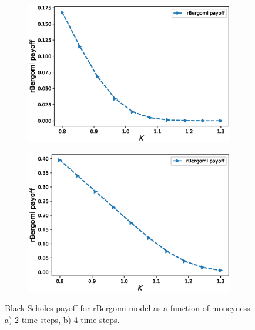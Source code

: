 \documentclass[11pt]{article}
\begin{document}
\begin{figure}[!h]
	\centering
	\begin{subfigure}{.5\textwidth}
		\centering
		\includegraphics[width=0.95\linewidth]{./figures/payoff_plots_H_007/rBergomi_payoff_2steps_wrt_monyeness}
		\caption{}
		\label{fig:rBergomi_payoff_4steps_wrt_monyeness_sub1}
	\end{subfigure}%
	\begin{subfigure}{.5\textwidth}
		\centering
		\includegraphics[width=0.95\linewidth]{./figures/payoff_plots_H_007/rBergomi_payoff_4steps_wrt_monyeness}
		\caption{ }
		\label{fig:rBergomi_payoff_4steps_wrt_monyeness_sub2}
	\end{subfigure}%
	\caption{Black Scholes payoff for rBergomi model as a function of moneyness a) $2$  time steps, b) $4$  time steps.}
	\label{fig:rBergomi_payoff_4steps_wrt_monyeness_1}
\end{figure}
\end{document}

